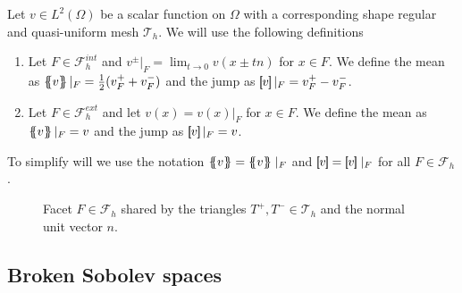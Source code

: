 \begin{definition}
    Let $v\in L^2( \Omega ) $ be a scalar function on $\Omega$ with a corresponding shape regular and quasi-uniform mesh $\mathcal{T}_{h} $. We will use the following definitions
    \begin{enumerate}[label=\arabic*)]
        \item Let $F \in \mathcal{F}^{int} _{h}$ and $v^{\pm}| _{F} = \lim_{t\to 0} v( x \pm tn)   $ for $x \in F$. We define the mean as $\left\{\!\!\left\{ v\right\}\!\!\right\} |_{F} = \frac{1}{2} (v^{+}_{F} + v^{-}_{F})   $ and the jump as $\left[\!\!\left[ v \right]\!\!\right]|_{F} =  v^{+}_{F} - v^{-}_{F} $.
        \item Let $F \in \mathcal{F}^{ext} _{h}$ and let $ v( x) =  v(x)|_{F} $ for  $x \in F$.
We define the mean as $\left\{\!\!\left\{ v\right\}\!\!\right\} |_{F} = v    $ and the jump as $\left[\!\!\left[ v \right]\!\!\right]|_{F} = v$.

    \end{enumerate}
    To simplify will we use the notation $\mean{ v } = \mean{ v } \mid _{F}    $ and $\jump{ v } = \jump{ v } \mid _{F}    $ for all $F \in \mathcal{F} _{h}$.

\end{definition}




\begin{figure}[!h]
\centering
{}

\caption{Facet $F \in \mathcal{F}_h $ shared by the triangles $T^{+}, T^{-} \in \mathcal{T}_{h} $ and the normal unit vector $n$.  }
    \label{fig:normal}
\end{figure}


\subsection{Broken Sobolev spaces}%
\label{sub:broken_sobolev_spaces}

